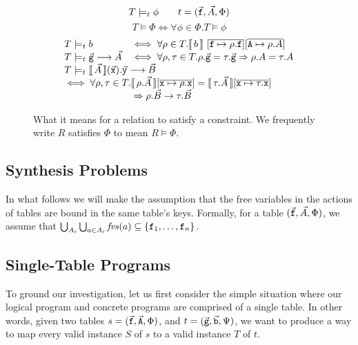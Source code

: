 \begin{figure}[tph]
  \[T \models_t \phi \qquad t = (\vec{\texttt{f}}, \vec A, \Phi)\]
  \[T \models \Phi \iff \forall \phi \in \Phi. T \models \phi \]
  \[\begin{array}{ll}
      T \models_t b &\iff \forall \rho \in T. \bracbb{b}~[\overline{\var f \mapsto \rho.\var{f}}][\overline{\var A \mapsto \rho.A}]\\

      T \models_t \vec{\var g} \longrightarrow \vec A & \iff \forall \rho, \tau \in T. \rho.\vec{\var g} = \tau.\vec{\var g} \Rightarrow
                                                        \rho.A = \tau.A \\
      
      \multicolumn 2 l {T \models_t \bracbb{\vec A}(\vec{\var x}).\vec{\var y}
      \longrightarrow \vec B} \\
      \multicolumn 2 l {\iff \forall \rho, \tau \in
    T. \bracbb{\rho.\vec A}[\overline{\var x \mapsto \rho.\var x}] =
    \bracbb{\tau.\vec A}[\overline{\var x \mapsto \tau.\var
      x}]}
      \\ \multicolumn 2 l {\phantom{\iff \forall \rho, \tau \in T.} \Rightarrow \rho.\vec B \rightarrow \tau.\vec B}
    \end{array}\]
  \caption{What it means for a relation to satisfy a constraint. We
    frequently write $R$ satisfies $\Phi$ to mean $R \models \Phi$.}
  \label{fig:conditions-semantics}
\end{figure}

\subsection{Synthesis Problems}

In what follows we will make the assumption that the free variables in
the actions of tables are bound in the same table's keys. Formally,
for a table
$(\vec{\texttt{f}}, \vec A, \Phi)$, we assume that $\bigcup_{A_i}\bigcup_{a
  \in A_i} \mathit{fvs}(a) \subseteq \{\texttt{f}_1, \ldots, \texttt{f}_n\}$.


\subsection{Single-Table Programs}

To ground our investigation, let us first consider the simple
situation where our logical program and concrete programs are
comprised of a single table. In other words, given two tables
$s = (\vec{\texttt{f}}, \vec{\texttt{A}}, \Phi)$, and
$t = (\vec{\texttt{g}}, \vec{\texttt{b}}, \Psi)$, we want to produce a way to
map every valid instance $S$ of $s$ to a valid instance $T$ of $t$.

